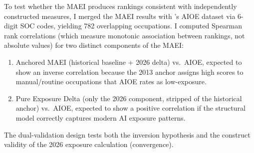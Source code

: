 To test whether the MAEI produces rankings consistent with independently constructed measures, I merged the MAEI results with \citet{Felten_Raj_Seamans_2021}'s AIOE dataset via 6-digit SOC codes, yielding 782 overlapping occupations. I computed Spearman rank correlations (which measure monotonic association between rankings, not absolute values) for two distinct components of the MAEI:

\begin{enumerate}
    \item Anchored MAEI (historical baseline + 2026 delta) vs.\ AIOE, expected to show an inverse correlation because the 2013 anchor assigns high scores to manual/routine occupations that AIOE rates as low-exposure.
    \item Pure Exposure Delta (only the 2026 component, stripped of the historical anchor) vs.\ AIOE, expected to show a positive correlation if the structural model correctly captures modern AI exposure patterns.
\end{enumerate}

The dual-validation design tests both the inversion hypothesis and the construct validity of the 2026 exposure calculation (convergence).
